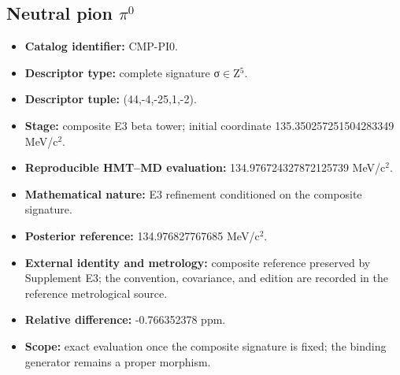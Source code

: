 \subsection{Neutral pion \texorpdfstring{\(\pi^{0}\)}{pi0}}
\begin{itemize}
\item \textbf{Catalog identifier:} CMP-PI0.
\item \textbf{Descriptor type:} complete signature σ\(\in\)Z\({}^{5}\).
\item \textbf{Descriptor tuple:} (44,-4,-25,1,-2).
\item \textbf{Stage:} composite E3 beta tower; initial coordinate 135.350257\allowbreak{}251504\allowbreak{}283349 MeV/c\({}^{2}\).
\item \textbf{Reproducible HMT--MD evaluation:} 134.976724\allowbreak{}327872\allowbreak{}125739 MeV/c\({}^{2}\).
\item \textbf{Mathematical nature:} E3 refinement conditioned on the composite signature.
\item \textbf{Posterior reference:} 134.976827\allowbreak{}767685 MeV/c\({}^{2}\).
\item \textbf{External identity and metrology:} composite reference preserved by Supplement E3; the convention, covariance, and edition are recorded in the reference metrological source.
\item \textbf{Relative difference:} -0.766352\allowbreak{}378 ppm.
\item \textbf{Scope:} exact evaluation once the composite signature is fixed; the binding generator remains a proper morphism.
\end{itemize}
